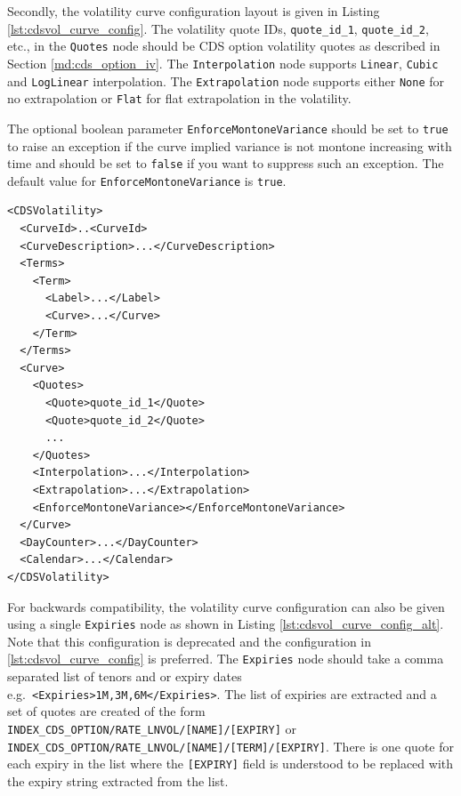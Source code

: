 Secondly, the volatility curve configuration layout is given in Listing \ref{lst:cdsvol_curve_config}. The volatility quote IDs, \lstinline!quote_id_1!, \lstinline!quote_id_2!, etc., in the \lstinline!Quotes! node should be CDS option volatility quotes as described in Section \ref{md:cds_option_iv}. The \lstinline!Interpolation! node supports \lstinline!Linear!, \lstinline!Cubic! and \lstinline!LogLinear! interpolation. The \lstinline!Extrapolation! node supports either \lstinline!None! for no extrapolation or \lstinline!Flat! for flat extrapolation in the volatility.

The optional boolean parameter \lstinline!EnforceMontoneVariance! should be set to \lstinline!true! to raise an exception if the curve implied variance is not montone increasing with time and should be set to \lstinline!false! if you want to suppress such an exception. The default value for \lstinline!EnforceMontoneVariance! is \lstinline!true!.

\begin{longlisting}
\begin{verbatim}
<CDSVolatility>
  <CurveId>..<CurveId>
  <CurveDescription>...</CurveDescription>
  <Terms>
    <Term>
      <Label>...</Label>
      <Curve>...</Curve>
    </Term>
  </Terms>
  <Curve>
    <Quotes>
      <Quote>quote_id_1</Quote>
      <Quote>quote_id_2</Quote>
      ...
    </Quotes>
    <Interpolation>...</Interpolation>
    <Extrapolation>...</Extrapolation>
    <EnforceMontoneVariance></EnforceMontoneVariance>
  </Curve>
  <DayCounter>...</DayCounter>
  <Calendar>...</Calendar>
</CDSVolatility>
\end{verbatim}
\caption{CDS volatility curve configuration}
\label{lst:cdsvol_curve_config}
\end{longlisting}

For backwards compatibility, the volatility curve configuration can also be given using a single \lstinline!Expiries! node as shown in Listing \ref{lst:cdsvol_curve_config_alt}. Note that this configuration is deprecated and the configuration in \ref{lst:cdsvol_curve_config} is preferred. The \lstinline!Expiries! node should take a comma separated list of tenors and or expiry dates e.g.\ \lstinline!<Expiries>1M,3M,6M</Expiries>!. The list of expiries are extracted and a set of quotes are created of the form \lstinline!INDEX_CDS_OPTION/RATE_LNVOL/[NAME]/[EXPIRY]! or \lstinline!INDEX_CDS_OPTION/RATE_LNVOL/[NAME]/[TERM]/[EXPIRY]!. There is one quote for each expiry in the list where the \lstinline![EXPIRY]! field is understood to be replaced with the expiry string extracted from the list.

